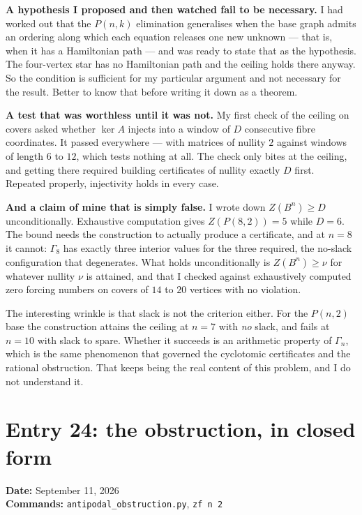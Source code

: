 \documentclass[12pt]{article}
\begin{document}
\textbf{A hypothesis I proposed and then watched fail to be necessary.} I had
worked out that the $P(n,k)$ elimination generalises when the base graph admits
an ordering along which each equation releases one new unknown --- that is, when
it has a Hamiltonian path --- and was ready to state that as the hypothesis. The
four-vertex star has no Hamiltonian path and the ceiling holds there anyway.
So the condition is sufficient for my particular argument and not necessary for
the result. Better to know that before writing it down as a theorem.

\textbf{A test that was worthless until it was not.} My first check of the
ceiling on covers asked whether $\ker A$ injects into a window of $D$
consecutive fibre coordinates. It passed everywhere --- with matrices of nullity
$2$ against windows of length $6$ to $12$, which tests nothing at all. The
check only bites at the ceiling, and getting there required building
certificates of nullity exactly $D$ first. Repeated properly, injectivity holds
in every case.

\textbf{And a claim of mine that is simply false.} I wrote down
$Z(B^n)\ge D$ unconditionally. Exhaustive computation gives $Z(P(8,2))=5$ while
$D=6$. The bound needs the construction to actually produce a certificate, and
at $n=8$ it cannot: $\Gamma_8$ has exactly three interior values for the three
required, the no-slack configuration that degenerates. What holds
unconditionally is $Z(B^n)\ge\nu$ for whatever nullity $\nu$ is attained, and
that I checked against exhaustively computed zero forcing numbers on covers of
$14$ to $20$ vertices with no violation.

The interesting wrinkle is that slack is not the criterion either. For the
$P(n,2)$ base the construction attains the ceiling at $n=7$ with \emph{no}
slack, and fails at $n=10$ with slack to spare. Whether it succeeds is an
arithmetic property of $\Gamma_n$, which is the same phenomenon that governed
the cyclotomic certificates and the rational obstruction. That keeps being the
real content of this problem, and I do not understand it.


\clearpage
\section*{Entry 24: the obstruction, in closed form}
\textbf{Date:} September 11, 2026\\
\textbf{Commands:} {\small\texttt{antipodal\_obstruction.py}, \texttt{zf n 2}}
\end{document}
